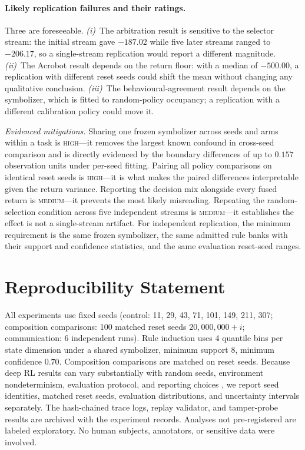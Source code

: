 \documentclass[11pt]{article}
\begin{document}
\paragraph{Likely replication failures and their ratings.}
Three are foreseeable. \emph{(i)}~The arbitration result is sensitive to the selector stream: the initial
stream gave $-187.02$ while five later streams ranged to $-206.17$, so a single-stream replication would
report a different magnitude. \emph{(ii)}~The Acrobot result depends on the return floor: with a median of
$-500.00$, a replication with different reset seeds could shift the mean without changing any qualitative
conclusion. \emph{(iii)}~The behavioural-agreement result depends on the symbolizer, which is fitted to
random-policy occupancy; a replication with a different calibration policy could move it.

\emph{Evidenced mitigations.} Sharing one frozen symbolizer across seeds and arms within a task is
\textsc{high}---it removes the largest known confound in cross-seed comparison and is directly evidenced
by the boundary differences of up to $0.157$ observation units under per-seed fitting. Pairing all policy
comparisons on identical reset seeds is \textsc{high}---it is what makes the paired differences
interpretable given the return variance. Reporting the decision mix alongside every fused return is
\textsc{medium}---it prevents the most likely misreading. Repeating the random-selection condition across
five independent streams is \textsc{medium}---it establishes the effect is not a single-stream artifact.
For independent replication, the minimum requirement is the same frozen symbolizer, the same
admitted rule banks with their support and confidence statistics, and the same evaluation
reset-seed ranges.


\section*{Reproducibility Statement}
\label{sec:repro}

All experiments use fixed seeds (control: 11, 29, 43, 71, 101, 149, 211, 307; composition comparisons:
100 matched reset seeds $20{,}000{,}000+i$; communication: 6 independent runs). Rule induction uses 4
quantile bins per state dimension under a shared symbolizer, minimum support 8, minimum confidence
$0.70$. Composition comparisons are matched on reset seeds. Because deep RL results can vary
substantially with random seeds, environment nondeterminism, evaluation protocol, and reporting
choices \cite{henderson2018deep}, we report seed identities, matched reset seeds, evaluation
distributions, and uncertainty intervals separately. The hash-chained trace logs, replay
validator, and tamper-probe results are archived with the experiment records. Analyses not pre-registered
are labeled exploratory. No human subjects, annotators, or sensitive data were involved.
\end{document}
